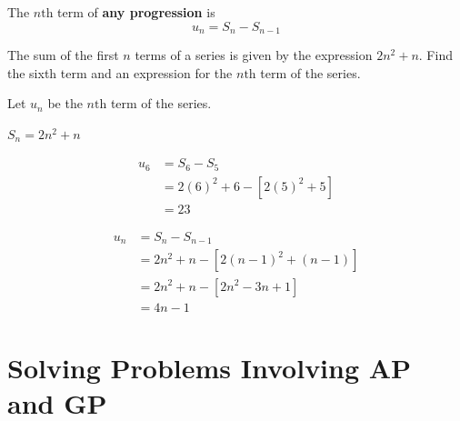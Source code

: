 \documentclass[11pt,a4paper]{book}
\begin{document}
\begin{tcolorbox}[colback=blue!5, colframe=black,boxrule=.4pt, sharpish corners]

The $n\text{th}$ term of \textbf{any progression} is
\[
u_{n}=S_{n}-S_{n-1}
\]
\end{tcolorbox}

\begin{example}

The sum of the first $n$ terms of a series is given by the expression
$2n^{2}+n$. Find the sixth term and an expression for the $n\text{th}$
term of the series.

\Solution

Let $u_{n}$ be the $n\text{th}$ term of the series.

$S_{n}=2n^{2}+n$

\begin{align*}
u_{6} & =S_{6}-S_{5}\\
 & =2\left(6\right)^{2}+6-\left[2\left(5\right)^{2}+5\right]\\
 & =23
\end{align*}

\begin{align*}
u_{n} & =S_{n}-S_{n-1}\\
 & =2n^{2}+n-\left[2\left(n-1\right)^{2}+\left(n-1\right)\right]\\
 & =2n^{2}+n-\left[2n^{2}-3n+1\right]\\
 & =4n-1
\end{align*}

\end{example}

\section{Solving Problems Involving AP and GP}
\end{document}
